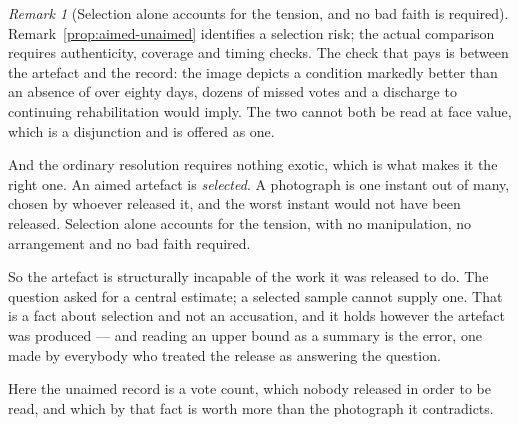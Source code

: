 \documentclass[11pt,a4paper]{article}
\theoremstyle{remark}
\newtheorem{remark}[definition]{Remark}
\begin{document}
\begin{remark}[Selection alone accounts for the tension, and no bad faith is required]\label{rem:selected}
Remark~\ref{prop:aimed-unaimed} identifies a selection risk; the actual comparison requires authenticity, coverage and timing checks. The check that pays is between the artefact and the record: the image
depicts a condition markedly better than an absence of over eighty days, dozens of missed votes and a
discharge to continuing rehabilitation would imply. The two cannot both be read at face value, which is
a disjunction and is offered as one.

And the ordinary resolution requires nothing exotic, which is what makes it the right one. An
aimed artefact is \emph{selected}. A photograph is one instant out of many, chosen by whoever released
it, and the worst instant would not have been released. Selection alone accounts for the tension,
with no manipulation, no arrangement and no bad faith required.

So the artefact is structurally incapable of the work it was released to do. The question asked
for a central estimate; a selected sample cannot supply one. That is a fact about selection and
not an accusation, and it holds however the artefact was produced --- and reading an upper bound as a
summary is the error, one made by everybody who treated the release as answering the question.

Here the unaimed record is a vote count, which nobody released in order to be read, and which by that
fact is worth more than the photograph it contradicts.
\end{remark}
\end{document}
